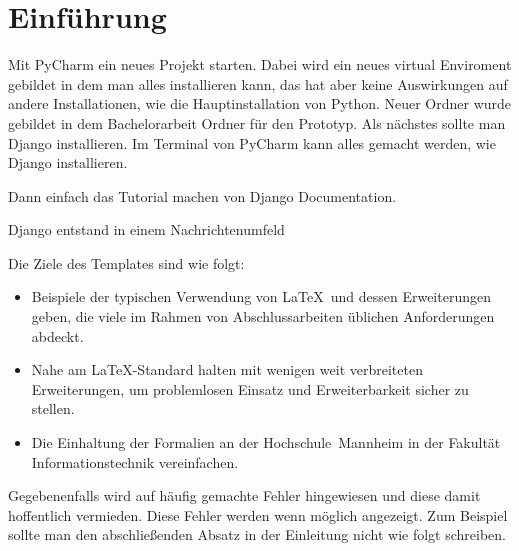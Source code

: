 \documentclass[11pt,a4paper]{report}
\begin{document}

\begin{abstract} 
\LaTeX\ bietet Buchdruckqualität für jedermann.
Wir zeigen anhand dieses durch persönliche Präferenzen geprägtes Template, 
wie man Buchdruckqualität für eine Abschlussarbeit einfach erreichen kann.
Dazu werden beispielhaft Lösungen zu üblichen Fragestellungen im Dokument 
vorgestellt.
Zunächst benötigt man ein passendes \LaTeX\ System mit einigen 
installierten Erweiterungspaketen, das es erlaubt das Template zu 
übersetzen. 
Neben den grundlegenden For\-ma\-tie\-rungs\-möglich\-keiten mit \LaTeX\ wird 
insbesondere das Erstellen und Einbinden von Grafiken, Listings und 
mathematischen Formeln gezeigt.
Des Weiteren werden Literatur- und andere Verzeichnisse eingebunden.
Nicht zuletzt finden sich auch sachdienliche Hinweise zum
Schreiben und Zitieren von Literatur.
\end{abstract}

\tableofcontents %

\chapter{Einführung} \label{chap:einf}

Mit PyCharm ein neues Projekt starten. Dabei wird ein neues virtual Enviroment gebildet in dem man alles installieren kann, das hat aber keine Auswirkungen auf andere Installationen, wie die Hauptinstallation von Python. Neuer Ordner wurde gebildet in dem Bachelorarbeit Ordner für den Prototyp. Als nächstes sollte man Django installieren. Im Terminal von PyCharm kann alles gemacht werden, wie Django installieren.

Dann einfach das Tutorial machen von Django Documentation.

Django entstand in einem Nachrichtenumfeld




Die Ziele des Templates sind wie folgt:
\begin{itemize}
\item Beispiele der typischen Verwendung von \LaTeX\ und dessen Erweiterungen 
  geben, die viele im Rahmen von Abschlussarbeiten üblichen Anforderungen 
  abdeckt.
\item Nahe am \LaTeX-Standard halten mit wenigen weit verbreiteten 
  Erweiterungen, um problemlosen Einsatz und Erweiterbarkeit sicher zu stellen.
\item Die Einhaltung der Formalien an der Hochschule~Mannheim in der
  Fakultät Informationstechnik vereinfachen.
\end{itemize}
Gegebenenfalls wird auf häufig gemachte Fehler hingewiesen und diese damit 
hoffentlich vermieden. 
Diese Fehler werden wenn möglich  angezeigt. 
Zum Beispiel sollte man den abschließenden Absatz in der Einleitung 
nicht wie folgt schreiben.
\end{document}
